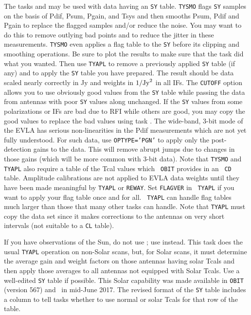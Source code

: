 The tasks {\tt {}} and {\tt {}} may be used with
 data having an {\tt SY} table.  {\tt TYSMO} flags {\tt SY}
samples on the basis of Pdif, Psum, Pgain, and Tsys and then smooths
Psum, Pdif and Pgain to replace the flagged samples and/or reduce the
noise.  You may want to do this to remove outlying bad points and to
reduce the jitter in these measurements.  {\tt TYSMO} even applies a
flag table to the {\tt SY} before its clipping and smoothing
operations.  Be sure to plot the results to make sure that the task
did what you wanted.  Then use {\tt TYAPL} to remove a previously
applied {\tt SY} table (if any) and to apply the {\tt SY} table you
have prepared.  The result should be data scaled nearly correctly in
Jy and weights in $1/{\rm Jy}^2$ in all IFs.  The {\tt CUTOFF} option
allows you to use obviously good values from the {\tt SY} table while
passing the data from antennas with poor {\tt SY} values along
unchanged.  If the {\tt SY} values from some polarizations or IFs are
bad due to RFI while others are good, you may copy the good values to
replace the bad values using task {\tt {}}\@.  The
wide-band, 3-bit mode of the EVLA has serious non-linearities in the
Pdif measurements which are not yet fully understood.  For such data,
use {\tt OPTYPE='PGN'} to apply only the post-detection gains to the
data.  This will remove abrupt jumps due to changes in those gains
(which will be more common with 3-bit data).  Note that {\tt TYSMO}
and {\tt TYAPL} also require a table of the Tcal values which {\tt
OBIT} provides in an \AIPS\ {\tt CD} table.  Amplitude calibrations
are not applied to EVLA data weights until they have been made
meaningful by {\tt TYAPL} or {\tt REWAY}\@.  Set {\tt FLAGVER} in {\tt
TYAPL} if you want to apply your flag table once and for all.  {\tt
TYAPL} can handle flag tables much larger than those that many other
tasks can handle.  Note that {\tt TYAPL} must copy the data set since
it makes corrections to the antennas on very short intervals (not
suitable to a {\tt CL} table).

If you have observations of the Sun, do not use {\tt {}};
use {\tt {}} instead.  This task does the usual {\tt TYAPL}
operation on non-Solar scans, but, for Solar scans, it must determine
the average gain and weight factors on those antennas having solar
Tcals and then apply those averages to all antennas not equipped with
Solar Tcals.  Use a well-edited {\tt SY} table if possible.  This
Solar capability was made available in {\tt OBIT} (version 567) and
\AIPS\ in mid-June 2017.  The revised format of the {\tt SY} table
includes a column to tell tasks whether to use normal or solar Tcals
for that row of the table.

